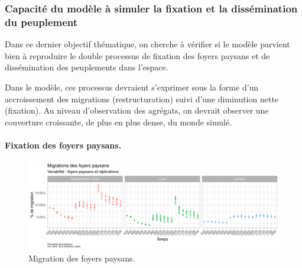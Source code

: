 \subsubsection{Capacité du modèle à simuler la fixation et la dissémination du peuplement \label{sssec:fixation-dissemination}}

Dans ce dernier objectif thématique, on cherche à vérifier si le modèle parvient bien à reproduire le double processus de fixation des foyers paysans et de dissémination des peuplements dans l'espace.

Dans le modèle, ces processus devraient s'exprimer sous la forme d'un accroissement des migrations (restructuration) suivi d'une diminution nette (fixation).
Au niveau d'observation des agrégats, on devrait observer une couverture croissante, de plus en plus dense, du monde simulé.

\paragraph{Fixation des foyers paysans.}

\begin{figure}[H]
	\centering
	\includegraphics[width=\linewidth]{img/results_6_6/FP_TypeDeplacements_Haut.pdf}
	\caption{Migration des foyers paysans.}
	\label{fig:results-fp-migrations-base}
\end{figure}

